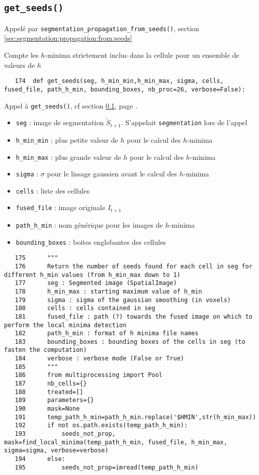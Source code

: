 \documentclass{article}
\def \mycolor {red}
\begin{document}
\subsection{\texttt{get\_seeds()}}
\label{sec:get:seeds}
\color{\mycolor}
Appel\'e par \texttt{segmentation\_propagation\_from\_seeds()},
section \ref{sec:segmentation:propagation:from:seeds}

Compte les $h$-minima strictement inclus dans la cellule pour un ensemble de valeurs de $h$
\color{black}
\begin{verbatim}
   174	def get_seeds(seg, h_min_min,h_min_max, sigma, cells, fused_file, path_h_min, bounding_boxes, nb_proc=26, verbose=False):
\end{verbatim} 
\color{\mycolor}
Appel \`a \texttt{get\_seeds()}, cf section \ref{sec:get:seeds}, page \pageref{sec:get:seeds}.
\begin{itemize}
\itemsep -0.5ex
\item \verb|seg| : image de segmentation $\tilde{S}_{t+1}$. S'appelait \verb|segmentation| lors de l'appel
\item \verb|h_min_min| : plus petite valeur de $h$ pour le calcul des $h$-minima
\item \verb|h_min_max| : plus grande valeur de $h$ pour le calcul des $h$-minima
\item \verb|sigma| : $\sigma$ pour le lissage gaussien avant le calcul des $h$-minima
\item \verb|cells| : liste des cellules
\item \verb|fused_file| : image originale $I_{t+1}$
\item \verb|path_h_min| : nom g\'en\'erique pour les images de $h$-minima
\item \verb|bounding_boxes| : boites englobantes des cellules
\end{itemize}
\color{black}
\begin{verbatim}  
   175	    """
   176	    Return the number of seeds found for each cell in seg for different h_min values (from h_min_max down to 1)
   177	    seg : Segmented image (SpatialImage)
   178	    h_min_max : starting maximum value of h_min
   179	    sigma : sigma of the gaussian smoothing (in voxels)
   180	    cells : cells contained in seg
   181	    fused_file : path (?) towards the fused image on which to perform the local minima detection
   182	    path_h_min : format of h minima file names
   183	    bounding_boxes : bounding boxes of the cells in seg (to fasten the computation)
   184	    verbose : verbose mode (False or True)
   185	    """
   186	    from multiprocessing import Pool
   187	    nb_cells={}
   188	    treated=[]
   189	    parameters={}
   190	    mask=None
   191	    temp_path_h_min=path_h_min.replace('$HMIN',str(h_min_max))
   192	    if not os.path.exists(temp_path_h_min):
   193	        seeds_not_prop, mask=find_local_minima(temp_path_h_min, fused_file, h_min_max, sigma=sigma, verbose=verbose)
   194	    else:
   195	        seeds_not_prop=imread(temp_path_h_min)
\end{verbatim} 
\end{document}
